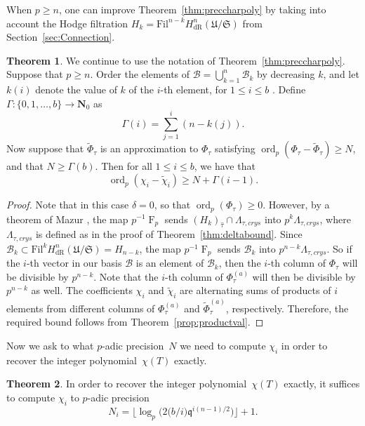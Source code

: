 \documentclass[a4paper,11pt]{article}
\numberwithin{equation}{section}
\providecommand{\floorbig}[1]{\bigl\lfloor#1\bigr\rfloor} %
\newcommand{\NN}{\mathbf{N}} %
\DeclareMathOperator{\ord}{ord}          %
\DeclareMathOperator{\Frob}{F}           %
\providecommand{\HdR}{H_{\text{dR}}}    %
\providecommand{\cB}{\mathcal{B}} %
\theoremstyle{definition}
\newtheorem{thm}{Theorem}[section]
\begin{document}
When $p \geq n$, one can improve Theorem~\ref{thm:preccharpoly} by taking into 
account the Hodge filtration $H_k=\mbox{Fil}^{n-k} \HdR^{n}(\mathfrak{U}/\mathfrak{S})$ 
from Section~\ref{sec:Connection}.

\begin{thm} \label{thm:pgeqn}
We continue to use the notation of Theorem~\ref{thm:preccharpoly}. Suppose that $p \geq n$. 
Order the elements of $\cB = \bigcup_{k=1}^n \cB_k$ by decreasing $k$, and let $k(i)$ 
denote the value of $k$ of the $i$-th element, for $1 \leq i \leq b$ . Define 
$\Gamma: \{0,1, \ldots, b\} \rightarrow \NN_0$ as
\[
\Gamma(i) = \sum_{j=1}^{i} (n-k(j)).
\]
Now suppose that $\tilde{\Phi}_{\tau}$ is an approximation to $\Phi_{\tau}$ 
satisfying $\ord_p (\Phi_{\tau}-\tilde{\Phi}_{\tau}) \geq N$, and that 
$N \geq \Gamma(b)$. Then for all $1 \leq i \leq b$, we have that 
\[
\ord_p(\chi_i-\tilde{\chi}_i) \geq N + \Gamma(i-1).
\]
\end{thm}
 
\begin{proof} 
Note that in this case $\delta=0$, so that $\ord_p(\Phi_{\tau}) \geq 0$. 
However, by a theorem of Mazur \cite{Mazur1972}, the map $p^{-1} \Frob_p$ 
sends $(H_k)_{\hat{\tau}} \cap \Lambda_{\tau,crys}$ into $p^k \Lambda_{\tau,crys}$, 
where $\Lambda_{\tau,crys}$ is defined as in the proof of 
Theorem~\ref{thm:deltabound}. Since 
$\cB_k \subset \mbox{Fil}^{k} \HdR^{n}(\mathfrak{U}/\mathfrak{S}) = H_{n-k}$, 
the map $p^{-1} \Frob_p$ sends $\cB_k$ into $p^{n-k} \Lambda_{\tau,crys}$. 
So if the $i$-th vector in our basis $\cB$ is an element of $\cB_k$, then 
the $i$-th column of $\Phi_{\tau}$ will be divisible by $p^{n-k}$. Note that 
the $i$-th column of $\Phi_{\tau}^{(a)}$ will then be divisible by $p^{n-k}$ 
as well. The coefficients $\chi_i$ and $\tilde{\chi}_i$ are alternating sums 
of products of $i$ elements from different columns of $\Phi_{\tau}^{(a)}$ 
and $\tilde{\Phi}_{\tau}^{(a)}$, respectively.  Therefore, the required bound 
follows from Theorem~\ref{prop:productval}. 
\end{proof}

Now we ask to what $p$-adic precision~$N$ we need to compute $\chi_i$ 
in order to recover the integer polynomial~$\chi(T)$ exactly.

\begin{thm} \label{thm:N0}
In order to recover the integer polynomial~$\chi(T)$ exactly, 
it suffices to compute $\chi_i$ to $p$-adic precision 
\begin{equation*}
N_i = \floorbig{\log_p \bigl( 2 \bigl( b/i \bigr) \mathfrak{q}^{i (n-1) / 2} \bigr)} + 1.
\end{equation*}
\end{thm}
\end{document}
